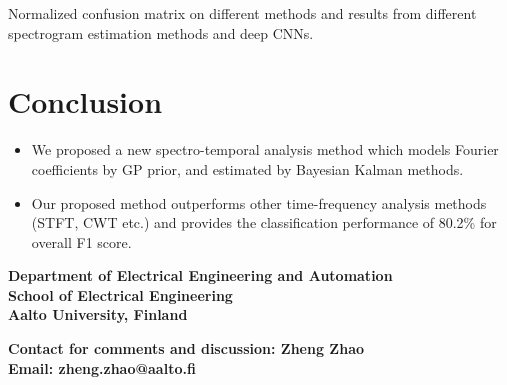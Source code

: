 \documentclass[portrait,a0,final]{a0poster} %
\newcommand{\sectionspace}{10mm} %
\begin{document}
\begin{minipage}{0.98\linewidth}
\begin{minipage}[t]{0.47\linewidth}
\vspace{5mm}
\large\centering
Normalized confusion matrix on different methods and results from different spectrogram estimation methods and deep CNNs.

\vspace{\sectionspace}
\section*{Conclusion}
\Large
\setlength{\parindent}{10mm}
\begin{itemize}
	\item We proposed a new spectro-temporal analysis method which models Fourier coefficients by GP prior, and estimated by Bayesian Kalman methods.
	\item Our proposed method outperforms other time-frequency analysis methods (STFT, CWT etc.) and provides the classification performance of 80.2\% for overall F1 score. 
\end{itemize}

{\footnotesize %




} %

\end{minipage}
\end{minipage} %

\vfill %


\begin{minipage}{0.95\linewidth} %


\footnotesize %

\begin{minipage}[t]{0.47\linewidth}%
\vspace{0pt}
\normalsize
\textsf{\textbf{Department of Electrical Engineering and Automation\\
School of Electrical Engineering\\
Aalto University, Finland}}

\end{minipage} %
\hspace{0.03\linewidth}
\begin{minipage}[t]{0.47\linewidth} %
\vspace{0pt}

\textsf{\normalsize\textbf{Contact for comments and discussion: Zheng Zhao\\
Email: zheng.zhao@aalto.fi}}
\end{minipage}



\end{minipage}




 \vspace*{0.03\linewidth} %
\end{document}
